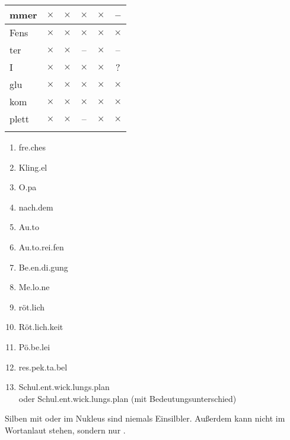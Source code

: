 \begin{center}
{\begin{tabular}[h!]{lccccc}
      mmer & $\times$ & $\times$ & $\times$ & $\times$ & -- \\
      \hline
      Fens & $\times$ & $\times$ & $\times$ & $\times$ & $\times$ \\
      ter & $\times$ & $\times$ & -- & $\times$ & -- \\
      \hline
      I & $\times$ & $\times$ & $\times$ & $\times$ & ? \\
      glu & $\times$ & $\times$ & $\times$ & $\times$ & $\times$ \\
      \hline
      kom & $\times$ & $\times$ & $\times$ & $\times$ & $\times$ \\
      plett & $\times$ & $\times$ & -- & $\times$ & $\times$ \\
      \lspbottomrule
    \end{tabular}
  }
\end{center}


\begin{enumerate}\Lf
  \item \Akz fre.ches
  \item \Akz Kling.el
  \item \Akz O.pa
  \item nach.\Akz dem
  \item \Akz Au.to
  \item \Akz Au.to.rei.fen
  \item Be.\Akz en.di.gung
  \item Me.\Akz lo.ne
  \item \Akz röt.lich
  \item \Akz Röt.lich.keit
  \item Pö.be.\Akz lei
  \item res.pek.\Akz ta.bel
  \item \Akz Schul.ent.wick.lungs.plan\\
    oder Schul.ent.\Akz wick.lungs.plan (mit Bedeutungsunterschied)
\end{enumerate}



Silben mit \textipa{[@]} oder \textipa{[5]} im Nukleus sind niemals Einsilbler.
Außerdem kann \textipa{[s]} nicht im Wortanlaut stehen, sondern nur \textipa{[z]}.



